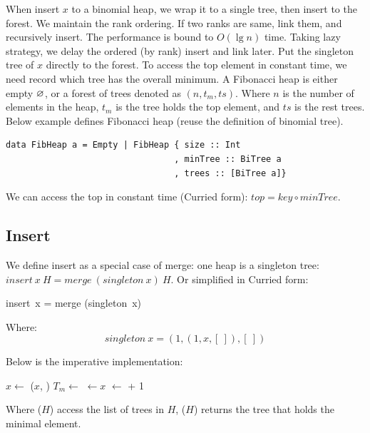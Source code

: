 \documentclass[b5paper]{article}
\begin{document}
When insert $x$ to a binomial heap, we wrap it to a single tree, then insert to the forest. We maintain the rank ordering. If two ranks are same, link them, and recursively insert. The performance is bound to $O(\lg n)$ time. Taking lazy strategy, we delay the ordered (by rank) insert and link later. Put the singleton tree of $x$ directly to the forest. To access the top element in constant time, we need record which tree has the overall minimum. A Fibonacci heap is either empty $\varnothing$, or a forest of trees denoted as $(n, t_m, ts)$. Where $n$ is the number of elements in the heap, $t_m$ is the tree holds the top element, and $ts$ is the rest trees. Below example defines Fibonacci heap (reuse the definition of binomial tree).

\begin{lstlisting}[style=Haskell]
data FibHeap a = Empty | FibHeap { size :: Int
                                 , minTree :: BiTree a
                                 , trees :: [BiTree a]}
\end{lstlisting}

We can access the top in constant time (Curried form): $top = key \circ \textit{minTree}$.

\subsection{Insert}

We define insert as a special case of merge: one heap is a singleton tree: $insert\ x\ H = merge\ (singleton\ x)\ H$. Or simplified in Curried form:

\be
insert\ x = merge \circ (singleton\ x)
\label{eq:fib-insert}
\ee

Where:
\[
singleton\ x = (1, (1, x, [\ ]), [\ ])
\]

Below is the imperative implementation:

\begin{algorithmic}[1]
  \State $x \gets$  
  \State {}($x$, )
  \State $T_m \gets$ 
    \State {} $\gets x$
  \EndIf
  \State {} $\gets$  + 1
\EndFunction
\end{algorithmic}

Where ($H$) access the list of trees in $H$, ($H$) returns the tree that holds the minimal element.
\end{document}
